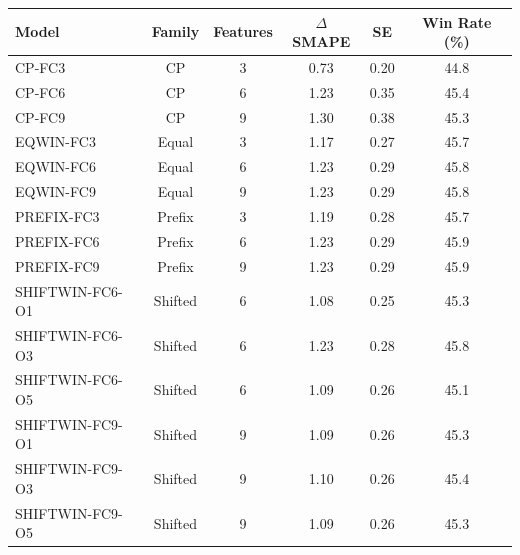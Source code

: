 \begin{tabular}{|l|c|c|c|c|c|}
\hline
Model & Family & Features & $\Delta$SMAPE & SE & Win Rate (\%) \\
\hline
CP-FC3 & CP & 3 & 0.73 & 0.20 & 44.8 \\
CP-FC6 & CP & 6 & 1.23 & 0.35 & 45.4 \\
CP-FC9 & CP & 9 & 1.30 & 0.38 & 45.3 \\
EQWIN-FC3 & Equal & 3 & 1.17 & 0.27 & 45.7 \\
EQWIN-FC6 & Equal & 6 & 1.23 & 0.29 & 45.8 \\
EQWIN-FC9 & Equal & 9 & 1.23 & 0.29 & 45.8 \\
PREFIX-FC3 & Prefix & 3 & 1.19 & 0.28 & 45.7 \\
PREFIX-FC6 & Prefix & 6 & 1.23 & 0.29 & 45.9 \\
PREFIX-FC9 & Prefix & 9 & 1.23 & 0.29 & 45.9 \\
SHIFTWIN-FC6-O1 & Shifted & 6 & 1.08 & 0.25 & 45.3 \\
SHIFTWIN-FC6-O3 & Shifted & 6 & 1.23 & 0.28 & 45.8 \\
SHIFTWIN-FC6-O5 & Shifted & 6 & 1.09 & 0.26 & 45.1 \\
SHIFTWIN-FC9-O1 & Shifted & 9 & 1.09 & 0.26 & 45.3 \\
SHIFTWIN-FC9-O3 & Shifted & 9 & 1.10 & 0.26 & 45.4 \\
SHIFTWIN-FC9-O5 & Shifted & 9 & 1.09 & 0.26 & 45.3 \\
\hline
\end{tabular}